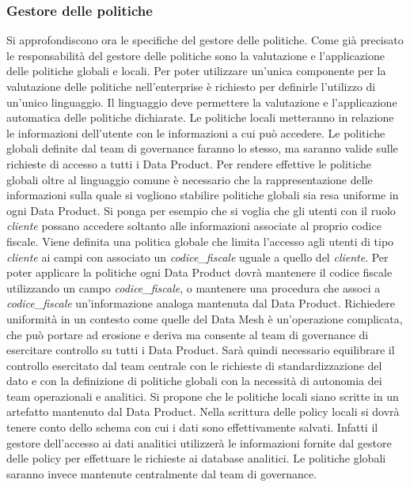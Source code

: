 \documentclass[12pt]{report}
\begin{document}
\subsubsection{Gestore delle politiche}
Si approfondiscono ora le specifiche del gestore delle politiche.
Come già precisato le responsabilità del gestore delle politiche sono la valutazione e l'applicazione delle politiche globali e locali.
Per poter utilizzare un'unica componente per la valutazione delle politiche nell'enterprise è richiesto per definirle l'utilizzo di un'unico linguaggio. 
Il linguaggio deve permettere la valutazione e l'applicazione automatica delle politiche dichiarate.
Le politiche locali metteranno in relazione le informazioni dell'utente con le informazioni a cui può accedere.
Le politiche globali definite dal team di governance faranno lo stesso, ma saranno valide sulle richieste di accesso a tutti i Data Product.
Per rendere effettive le politiche globali oltre al linguaggio comune è necessario che la rappresentazione delle informazioni sulla quale si vogliono stabilire politiche globali sia resa uniforme in ogni Data Product.
Si ponga per esempio che si voglia che gli utenti con il ruolo \textit{cliente} possano accedere soltanto alle informazioni associate al proprio codice fiscale.
Viene definita una politica globale che limita l'accesso agli utenti di tipo \textit{cliente} ai campi con associato un \textit{codice\_fiscale} uguale a quello del \textit{cliente}.
Per poter applicare la politiche ogni Data Product dovrà mantenere il codice fiscale utilizzando un campo \textit{codice\_fiscale}, o mantenere una procedura che associ  a \textit{codice\_fiscale} un'informazione analoga mantenuta dal Data Product.
Richiedere uniformità in un contesto come quelle del Data Mesh è un'operazione complicata, che può portare ad erosione e deriva ma consente al team di governance di esercitare controllo su tutti i Data Product.
Sarà quindi necessario equilibrare il controllo esercitato dal team centrale con le richieste di standardizzazione del dato e con la definizione di politiche globali con la necessità di autonomia dei team operazionali e analitici.
Si propone che le politiche locali siano scritte in un artefatto mantenuto dal Data Product. 
Nella scrittura delle policy locali si dovrà tenere conto dello schema con cui i dati sono effettivamente salvati.
Infatti il gestore dell'accesso ai dati analitici utilizzerà le informazioni fornite dal gestore delle policy per effettuare le richieste ai database analitici.
Le politiche globali saranno invece mantenute centralmente dal team di governance.
\end{document}
